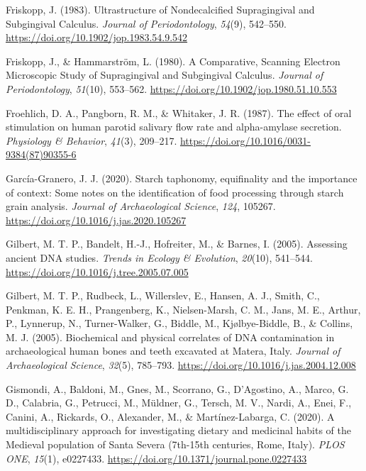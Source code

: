 \documentclass[
  letterpaper,
]{book}
\newlength{\cslhangindent}
\newlength{\cslentryspacingunit} %
\newenvironment{CSLReferences}[2] %
 {%
  \setlength{\parindent}{0pt}
  \ifodd #1
  \let\oldpar\par
  \def\par{\hangindent=\cslhangindent\oldpar}
  \fi
  \setlength{\parskip}{#2\cslentryspacingunit}
 }%
 {}
\begin{document}
\begin{CSLReferences}{1}{0}
\leavevmode{}%
Friskopp, J. (1983). Ultrastructure of {Nondecalcified Supragingival}
and {Subgingival Calculus}. \emph{Journal of Periodontology},
\emph{54}(9), 542--550. \url{https://doi.org/10.1902/jop.1983.54.9.542}

\leavevmode{}%
Friskopp, J., \& Hammarström, L. (1980). A {Comparative}, {Scanning
Electron Microscopic Study} of {Supragingival} and {Subgingival
Calculus}. \emph{Journal of Periodontology}, \emph{51}(10), 553--562.
\url{https://doi.org/10.1902/jop.1980.51.10.553}

\leavevmode{}%
Froehlich, D. A., Pangborn, R. M., \& Whitaker, J. R. (1987). The effect
of oral stimulation on human parotid salivary flow rate and
alpha-amylase secretion. \emph{Physiology \& Behavior}, \emph{41}(3),
209--217. \url{https://doi.org/10.1016/0031-9384(87)90355-6}

\leavevmode{}%
García-Granero, J. J. (2020). Starch taphonomy, equifinality and the
importance of context: {Some} notes on the identification of food
processing through starch grain analysis. \emph{Journal of
Archaeological Science}, \emph{124}, 105267.
\url{https://doi.org/10.1016/j.jas.2020.105267}

\leavevmode{}%
Gilbert, M. T. P., Bandelt, H.-J., Hofreiter, M., \& Barnes, I. (2005).
Assessing ancient {DNA} studies. \emph{Trends in Ecology \& Evolution},
\emph{20}(10), 541--544.
\url{https://doi.org/10.1016/j.tree.2005.07.005}

\leavevmode{}%
Gilbert, M. T. P., Rudbeck, L., Willerslev, E., Hansen, A. J., Smith,
C., Penkman, K. E. H., Prangenberg, K., Nielsen-Marsh, C. M., Jans, M.
E., Arthur, P., Lynnerup, N., Turner-Walker, G., Biddle, M.,
Kjølbye-Biddle, B., \& Collins, M. J. (2005). Biochemical and physical
correlates of {DNA} contamination in archaeological human bones and
teeth excavated at {Matera}, {Italy}. \emph{Journal of Archaeological
Science}, \emph{32}(5), 785--793.
\url{https://doi.org/10.1016/j.jas.2004.12.008}

\leavevmode{}%
Gismondi, A., Baldoni, M., Gnes, M., Scorrano, G., D'Agostino, A.,
Marco, G. D., Calabria, G., Petrucci, M., Müldner, G., Tersch, M. V.,
Nardi, A., Enei, F., Canini, A., Rickards, O., Alexander, M., \&
Martínez-Labarga, C. (2020). A multidisciplinary approach for
investigating dietary and medicinal habits of the {Medieval} population
of {Santa Severa} (7th-15th centuries, {Rome}, {Italy}). \emph{PLOS
ONE}, \emph{15}(1), e0227433.
\url{https://doi.org/10.1371/journal.pone.0227433}


\end{CSLReferences}
\end{document}
